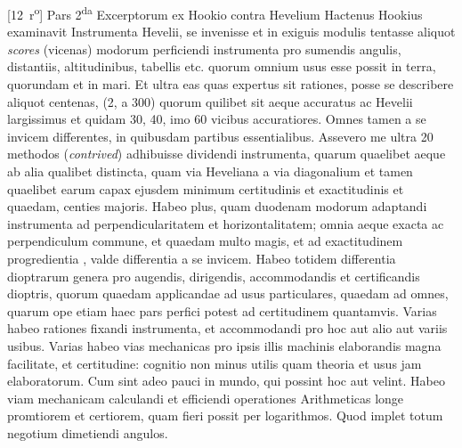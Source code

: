 [12~r\textsuperscript{o}] Pars 2\textsuperscript{da} Excerptorum ex Hookio\protect{} contra Hevelium\protect{} 
\pend 
\count{}
\count{}
\count{}
\pstart Hactenus Hookius\protect{} examinavit Instrumenta\protect{} Hevelii\protect{},  se invenisse et in exiguis modulis tentasse aliquot \textit{scores} (vicenas) modorum perficiendi instrumenta pro sumendis angulis, distantiis, altitudinibus, tabellis etc. quorum omnium usus esse possit in terra, quorundam et in mari. Et ultra eas quas expertus sit rationes, posse se describere aliquot centenas, (2, a 300) quorum quilibet sit aeque accuratus ac Hevelii largissimus et quidam 30, 40, imo 60 vicibus accuratiores. Omnes tamen a se invicem differentes, in quibusdam partibus essentialibus. Assevero me ultra 20 methodos (\textit{contrived}) adhibuisse dividendi instrumenta, quarum quaelibet aeque ab alia qualibet distincta, quam via Heveliana a via diagonalium et tamen quaelibet earum capax ejusdem minimum certitudinis et exactitudinis et quaedam, centies majoris. Habeo plus, quam duodenam modorum adaptandi instrumenta ad perpendicularitatem et horizontalitatem; omnia aeque exacta ac perpendiculum commune, et quaedam multo magis, et ad exactitudinem progredientia , valde differentia a se invicem. Habeo totidem differentia dioptrarum\protect{} genera pro augendis, dirigendis, accommodandis et certificandis dioptris, quorum quaedam applicandae ad usus particulares, quaedam ad omnes, quarum ope etiam haec pars perfici potest ad certitudinem quantamvis. Varias habeo rationes fixandi instrumenta, et accommodandi pro hoc aut alio aut variis usibus. Varias habeo vias mechanicas pro ipsis illis machinis elaborandis magna facilitate, et certitudine: cognitio non minus utilis quam theoria et usus jam elaboratorum. Cum sint adeo pauci in mundo, qui possint hoc aut velint. Habeo viam mechanicam calculandi et efficiendi operationes Arithmeticas longe promtiorem et certiorem, quam fieri possit per logarithmos. Quod implet totum negotium dimetiendi angulos. 
